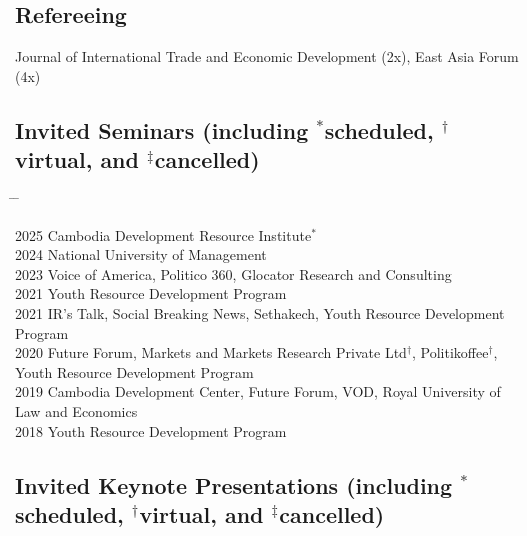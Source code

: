 \documentclass[10pt,a4paper]{article}
\newcommand{\tabbedblock}[1]{

	\begin{tabbing}
		\hspace{2cm} \= \hspace{4cm} \= \kill
		#1
	\end{tabbing}
}
\begin{document}
\subsection*{Refereeing}
	
	Journal of International Trade and Economic Development (2x), East Asia Forum (4x)

\subsection*{Invited Seminars (including $^\ast$scheduled, $^\dag$virtual, and $^\ddag$cancelled)}

\tabbedblock{
	2025 \> Cambodia Development Resource Institute$^\ast$\\ 
	
	2024 \> National University of Management\\ 
	
	2023 \> Voice of America, Politico 360, Glocator Research and Consulting \\
		
	2021  \>  Youth Resource Development Program \\
	
	
	2021  \>  IR’s Talk, Social Breaking News, Sethakech, Youth Resource Development Program \\
	
	2020 \>  Future Forum, Markets and Markets Research Private Ltd$^\dag$, Politikoffee$^\dag$, \\
	\> Youth Resource Development Program \\
	
	2019 \> Cambodia Development Center, Future Forum, VOD, Royal University of Law and Economics \\
	
	2018 \> Youth Resource Development Program
}
	
	
\subsection*{Invited Keynote Presentations (including $^\ast$scheduled, $^\dag$virtual, and $^\ddag$cancelled)}
\end{document}
